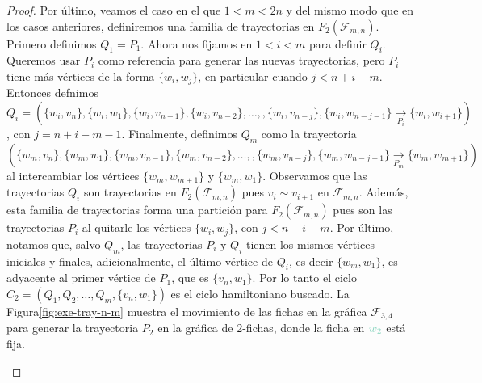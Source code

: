 \begin{proof}
    Por \'ultimo, veamos el caso en el que $1<m<2n$ y del mismo modo que en los
    casos anteriores, definiremos una familia de trayectorias en $F_2(\mathcal{F}_{m,n})$.
    Primero definimos $Q_1 =P_1$. Ahora nos fijamos en $1<i<m$ para definir
    $Q_i$. Queremos usar $P_i$ como referencia para generar las nuevas
    trayectorias, pero $P_i$ tiene m\'as v\'ertices de la forma $\{w_i,w_j\}$,
    en particular cuando $j< n+i-m$. Entonces defnimos $Q_i =
    (\{w_i,v_n\},\{w_i,w_1\},\{w_i,v_{n-1}\},\{w_i,v_{n-2}\}, \dots,
    ,\{w_i,v_{n-j}\},\{w_i,w_{n-j-1}\}\xrightarrow[P_i]{}\{w_i,w_{i+1}\})$, con
    $j = n+i-m-1$. Finalmente, definimos $Q_m$ como la trayectoria
    $(\{w_m,v_n\},\{w_m,w_1\},\{w_m,v_{n-1}\},\{w_m,v_{n-2}\}, \dots,
    ,\{w_m,v_{n-j}\},\{w_m,w_{n-j-1}\}\xrightarrow[P_m]{}\{w_m,w_{m+1}\})$ al
    intercambiar los v\'ertices $\{w_m,w_{m+1}\}$ y $\{w_m,w_1\}$. Observamos
    que las trayectorias $Q_i$ son trayectorias en $F_2(\mathcal{F}_{m,n})$ pues $v_i \sim
    v_{i+1}$ en $\mathcal{F}_{m,n}$. Adem\'as, esta familia de trayectorias forma una
    partici\'on para $F_2(\mathcal{F}_{m,n})$ pues son las trayectorias $P_i$ al quitarle
    los v\'ertices $\{w_i,w_j\}$, con $j< n+i-m$. Por \'ultimo, notamos que,
    salvo $Q_m$, las trayectorias $P_i$ y $Q_i$ tienen los mismos v\'ertices
    iniciales y finales, adicionalmente, el \'ultimo v\'ertice de $Q_i$, es
    decir $\{w_m,w_1\}$, es adyacente al primer v\'ertice de $P_1$, que es
    $\{v_n,w_1\}$. Por lo tanto el ciclo $C_2=(Q_1,Q_2, \dots, Q_m,
    \{v_n,w_1\})$ es el ciclo hamiltoniano buscado. La
    Figura\ref{fig:exe-tray-n-m} muestra el movimiento de las fichas en la
    gr\'afica $\mathcal{F}_{3,4}$ para generar la trayectoria $P_2$ en la gr\'afica de
    $2$-fichas, donde la ficha en ${\color{azulClaro}w_2}$ est\'a fija.


    \begin{figure}[ht!]
        \centering
\end{figure}
\end{proof}
